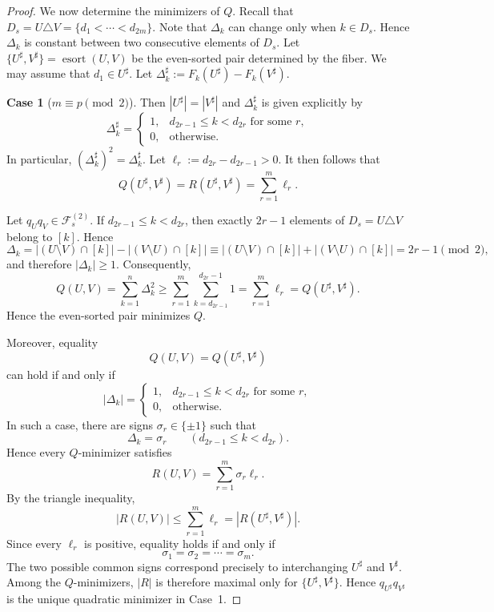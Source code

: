 \documentclass[11pt]{amsart}
\theoremstyle{definition}
\newcommand{\esort}{\operatorname{esort}}
\numberwithin{equation}{section}
\begin{document}
\begin{proof}
We now determine the minimizers of \(Q\). 
Recall that $D_s=U\triangle V=\{d_1<\cdots<d_{2m}\}$.
Note that $\Delta_k$ can change only when $k\in D_s$.
Hence $\Delta_k$ is constant between two consecutive elements of $D_s$.
Let $\{U^\sharp,V^\sharp\}=\esort(U,V)$ be the even-sorted pair determined by the fiber. 
We may assume that \(d_1\in U^\sharp\).
Let $ \Delta_k^\sharp
:= F_k(U^\sharp)-F_k(V^\sharp)$.

\medskip

\noindent
{\bf Case 1} (\(m\equiv p\pmod2\)). Then $|U^\sharp|=|V^\sharp|$
and $\Delta_k^\sharp$
is given explicitly by
\[
 \Delta_k^\sharp=
 \begin{cases}
1, & d_{2r-1}\le k<d_{2r}
    \text{ for some }r,\\
0, & \text{otherwise}.
 \end{cases}
\]
In particular, $(\Delta_k^\sharp)^2=\Delta_k^\sharp $.
Let $\ell_r:=d_{2r}-d_{2r-1}>0$. 
It then follows that
\[
Q(U^\sharp,V^\sharp) =
R(U^\sharp,V^\sharp) =
 \sum_{r=1}^m\ell_r.
\]

Let $q_Uq_V\in\mathcal{F}^{(2)}_s$.
If $d_{2r-1}\le k<d_{2r}$, then exactly $2r-1$ elements of
$D_s=U\triangle V$ belong to $[k]$. 
Hence
\[
\Delta_k
=
|(U\setminus V)\cap[k]|
-
|(V\setminus U)\cap[k]|
\equiv
|(U\setminus V)\cap[k]|
+
|(V\setminus U)\cap[k]|
= 2r - 1
\pmod 2
,\]
and therefore $|\Delta_k|\ge1$.
Consequently,
\[
Q(U,V) =
 \sum_{k=1}^n\Delta_k^2
 \ge
 \sum_{r=1}^m
 \sum_{k=d_{2r-1}}^{d_{2r}-1}1
=
 \sum_{r=1}^m\ell_r
= Q(U^\sharp,V^\sharp).
\]
Hence the even-sorted pair minimizes $Q$.

Moreover, equality
\[
Q(U,V)=Q(U^\sharp,V^\sharp)
\]
can hold if and only if 
\[
 |\Delta_k|=
 \begin{cases}
1, & d_{2r-1}\le k<d_{2r}
    \text{ for some }r,\\
0, & \text{otherwise}.
 \end{cases}
\]
In such a case,
there are signs $\sigma_r\in\{\pm1\}$
such that
\[
 \Delta_k=\sigma_r
 \qquad
(d_{2r-1}\le k<d_{2r}).
\]
Hence every \(Q\)-minimizer satisfies
\[
R(U,V) =
 \sum_{r=1}^m\sigma_r\ell_r.
\]
By the triangle inequality,
\[
|R(U,V)|
 \le
 \sum_{r=1}^m\ell_r
= |R(U^\sharp,V^\sharp)|.
\]
Since every \(\ell_r\) is positive, equality holds if and only if
\[
 \sigma_1=\sigma_2=\cdots=\sigma_m.
\]
The two possible common signs correspond precisely to interchanging
\(U^\sharp\) and \(V^\sharp\).
Among the $Q$-minimizers, $|R|$ is therefore maximal only for $\{U^\sharp,V^\sharp\}$. Hence $q_{U^\sharp}q_{V^\sharp}$ is the unique quadratic minimizer in Case~1.


\end{proof}
\end{document}
